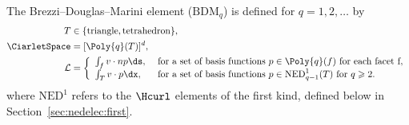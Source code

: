 \begin{definition}
  The Brezzi--Douglas--Marini element ($\mathrm{BDM}_q$)
  is defined for $q = 1, 2, \dots$ by
  \begin{align}
    T &\in \{ \mathrm{triangle}{}, \mathrm{tetrahedron}{}\}, \\
    \CiarletSpace &= [\Poly{q}(T)]^d, \\
    \mathcal{L} &=
    \left \{
    \begin{array}{ll}
      \int_{f} v \cdot n p \ds,
      & \text{ for a set of basis functions } p \in \Poly{q}(f)
      \text{ for each facet } $f$, \\
      \int_{T} v \cdot p \dx, &
      \text{ for a set of basis functions } p \in \mathrm{NED}^1_{q-1}(T)
      \text{ for } q \geqslant 2. \\
    \end{array}
    \right.
  \end{align}
  where $\mathrm{NED}^1$ refers to the \nedelec{} $\Hcurl$ elements of
  the first kind, defined below in Section~\ref{sec:nedelec:first}.
\end{definition}

